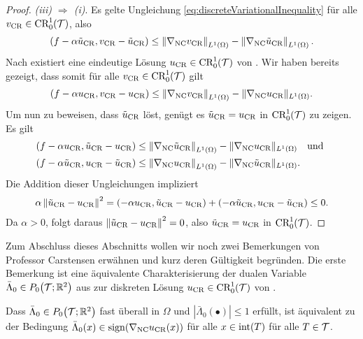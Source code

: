 \begin{proof}
  \textit{(iii) $\Rightarrow$ (i)}.
  Es gelte Ungleichung \eqref{eq:discreteVariationalInequality} für alle
  $v_\textup{CR}\in\textup{CR}^1_0(\mathcal{T})$, also
  \begin{align*}
    \left(f-\alpha\tilde{u}_{\textup{CR}},v_\textup{CR}-\tilde{u}_{\textup{CR}}\right) 
    \leq
    \left\Vert\nabla_\textup{NC}v_\textup{CR}\right\Vert_{L^1(\Omega)}
    -\left\Vert\nabla_\textup{NC}\tilde{u}_{\textup{CR}}\right\Vert_{L^1(\Omega)}.
  \end{align*}
  Nach  existiert eine eindeutige
  Lösung $u_\textup{CR}\in\textup{CR}^1_0(\mathcal{T})$ von .
  Wir haben bereits gezeigt, dass somit für alle
  $v_\textup{CR}\in\textup{CR}^1_0(\mathcal{T})$ gilt
  \begin{align*}
    \left(f-\alpha u_\textup{CR},v_\textup{CR}-u_\textup{CR}\right) 
    \leq
    \left\Vert\nabla_\textup{NC}v_\textup{CR}\right\Vert_{L^1(\Omega)}
    -\Vert\nabla_\textup{NC}u_\textup{CR}\Vert_{L^1(\Omega)}.
  \end{align*}
  Um nun zu beweisen, dass $\tilde{u}_{\textup{CR}}$  löst, genügt
  es $\tilde{u}_{\textup{CR}}=u_\textup{CR}$ in $\textup{CR}^1_0(\mathcal{T})$ zu zeigen.
  Es gilt
  \begin{align*}
    \left(f-\alpha u_\textup{CR},\tilde{u}_{\textup{CR}}-u_\textup{CR}\right) 
    &\leq
    \left\Vert\nabla_\textup{NC}\tilde{u}_{\textup{CR}}\right\Vert_{L^1(\Omega)}
    -\Vert\nabla_\textup{NC}u_\textup{CR}\Vert_{L^1(\Omega)}\quad\text{und }\\
    \left(f-\alpha\tilde{u}_{\textup{CR}},u_\textup{CR}-\tilde{u}_{\textup{CR}}\right) 
    &\leq
    \left\Vert\nabla_\textup{NC}u_\textup{CR}\right\Vert_{L^1(\Omega)}
    -\Vert\nabla_\textup{NC}\tilde{u}_{\textup{CR}}\Vert_{L^1(\Omega)}. 
  \end{align*}
  Die Addition dieser Ungleichungen
  impliziert
  \begin{align*}
    \alpha\left\Vert\tilde{u}_{\textup{CR}}-u_\textup{CR}\right\Vert^2=
    \left(-\alpha u_\textup{CR},\tilde{u}_{\textup{CR}}-u_\textup{CR}\right) 
    + \left(-\alpha\tilde{u}_{\textup{CR}},u_\textup{CR}-\tilde{u}_{\textup{CR}}\right) 
    \leq
    0.
  \end{align*}
  Da $\alpha>0$, folgt daraus $\left\Vert\tilde{u}_{\textup{CR}}-u_\textup{CR}\right\Vert^2=0$,
  also $\tilde{u}_{\textup{CR}}=u_\textup{CR}$ in $\textup{CR}^1_0(\mathcal{T})$.
\end{proof}

Zum Abschluss dieses Abschnitts wollen wir noch zwei Bemerkungen von Professor
Carstensen erwähnen und kurz deren Gültigkeit begründen.
Die erste Bemerkung ist eine äquivalente Charakterisierung der dualen Variable
$\bar\Lambda_0\in P_0\!\left(\mathcal{T};\mathbb{R}^2\right)$ aus
 zur diskreten Lösung
$u_\textup{CR}\in\textup{CR}^1_0(\mathcal{T})$ von .

\begin{remark}
  Dass $\bar\Lambda_0\in P_0\!\left(\mathcal{T};\mathbb{R}^2\right)$ fast überall in $\Omega$
   und
  $|\bar\Lambda_0(\bullet)|\leq 1$ erfüllt, ist äquivalent zu der Bedingung
  $\bar\Lambda_0(x)\in\operatorname{sign}(\nabla_\textup{NC} u_\textup{CR}(x))$ für alle $x\in\operatorname{int}(T)$ für
  alle $T\in\mathcal{T}$.   
\end{remark}

